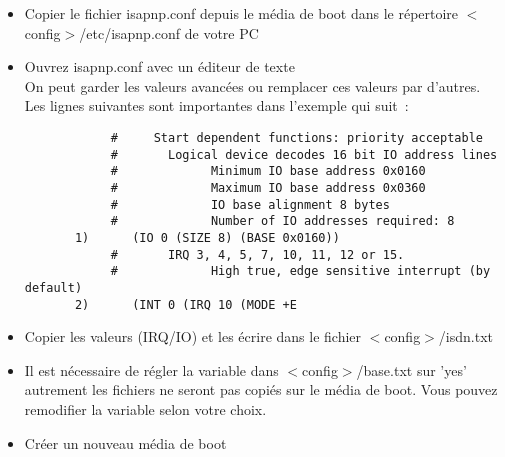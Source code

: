   \begin{itemize}
  \item Copier le fichier isapnp.conf depuis le média de boot dans le
    répertoire $<$config$>$/etc/isapnp.conf de votre PC
  \item Ouvrez isapnp.conf avec un éditeur de texte\\
        On peut garder les valeurs avancées ou remplacer ces valeurs
        par d'autres. Les lignes suivantes sont importantes dans
        l'exemple qui suit~:

\begin{example}
\begin{verbatim}
            #     Start dependent functions: priority acceptable
            #       Logical device decodes 16 bit IO address lines
            #             Minimum IO base address 0x0160
            #             Maximum IO base address 0x0360
            #             IO base alignment 8 bytes
            #             Number of IO addresses required: 8
       1)      (IO 0 (SIZE 8) (BASE 0x0160))
            #       IRQ 3, 4, 5, 7, 10, 11, 12 or 15.
            #             High true, edge sensitive interrupt (by default)
       2)      (INT 0 (IRQ 10 (MODE +E
\end{verbatim}
\end{example}

  \item Copier les valeurs (IRQ/IO) et les écrire dans le fichier
    $<$config$>$/isdn.txt
  \item Il est nécessaire de régler la variable 
    dans $<$config$>$/base.txt sur 'yes' autrement les fichiers ne seront
    pas copiés sur le média de boot. Vous pouvez remodifier la variable
     selon votre choix.
  \item Créer un nouveau média de boot
  \end{itemize}

